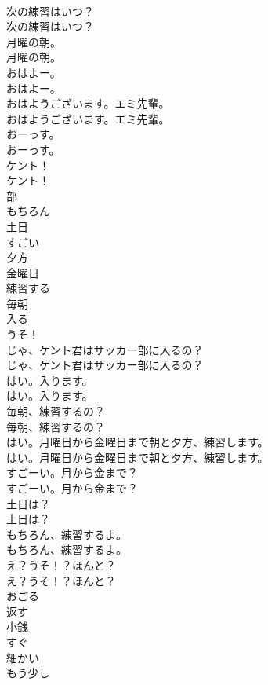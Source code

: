 \documentclass[8pt]{extreport}
\begin{document}
\begin{CJK}{UTF8}{min}
\\	次の練習はいつ？	
\\	次の練習はいつ？ 
\\	月曜の朝。	
\\	月曜の朝。 
\\	おはよー。	
\\	おはよー。 
\\	おはようございます。エミ先輩。	
\\	おはようございます。エミ先輩。 
\\	おーっす。	
\\	おーっす。 
\\	ケント！	
\\	ケント！ 
\\	部
\\	もちろん
\\	土日
\\	すごい
\\	夕方
\\	金曜日
\\	練習する
\\	毎朝
\\	入る
\\	うそ！
\\	じゃ、ケント君はサッカー部に入るの？	
\\	じゃ、ケント君はサッカー部に入るの？ 
\\	はい。入ります。	
\\	はい。入ります。 
\\	毎朝、練習するの？	
\\	毎朝、練習するの？ 
\\	はい。月曜日から金曜日まで朝と夕方、練習します。	
\\	はい。月曜日から金曜日まで朝と夕方、練習します。 
\\	すごーい。月から金まで？	
\\	すごーい。月から金まで？ 
\\	土日は？	
\\	土日は？ 
\\	もちろん、練習するよ。	
\\	もちろん、練習するよ。 
\\	え？うそ！？ほんと？	
\\	え？うそ！？ほんと？ 
\\	おごる
\\	返す
\\	小銭
\\	すぐ
\\	細かい
\\	もう少し

\end{CJK}
\end{document}
